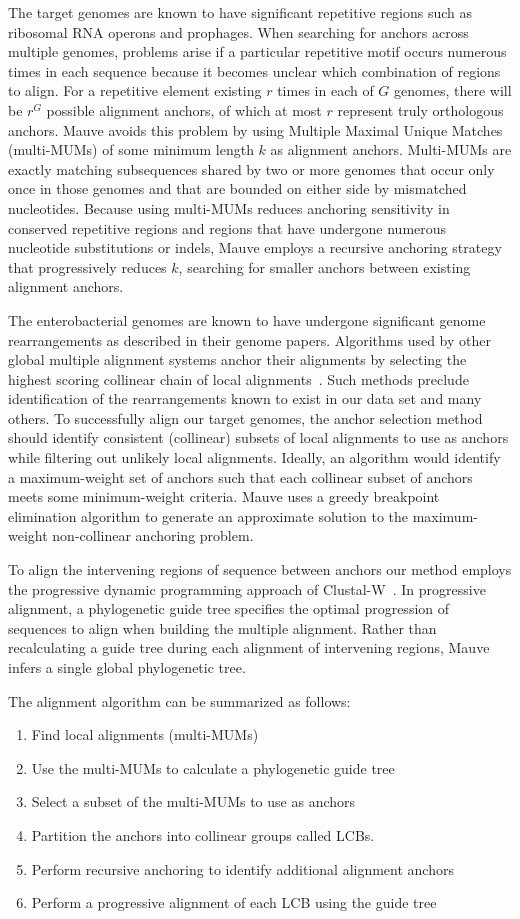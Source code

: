 \documentclass[titlepage,11pt]{article}
\begin{document}
The target genomes are known to have significant repetitive regions such as
ribosomal RNA operons and prophages.  When searching for anchors across
multiple genomes, problems arise if a particular repetitive motif occurs
numerous times in each sequence because it becomes unclear which combination of
regions to align.  For a repetitive element existing $r$ times in each of $G$
genomes, there will be $r^G$ possible alignment anchors, of which at most $r$
represent truly orthologous anchors.  Mauve avoids this
problem by using Multiple Maximal Unique Matches (multi-MUMs) of some minimum
length $k$ as alignment
anchors.  Multi-MUMs are exactly matching subsequences shared by two or more
genomes that occur only once in those genomes and that are bounded on either
side by mismatched nucleotides.  Because using multi-MUMs reduces
anchoring sensitivity in conserved repetitive regions and regions that have undergone
numerous nucleotide substitutions or indels, Mauve employs a recursive anchoring
strategy that progressively reduces $k$, searching for smaller anchors between
existing alignment anchors.

The enterobacterial genomes are known to have undergone significant genome
rearrangements as described in their genome papers.  Algorithms used by other
global multiple
alignment systems anchor their alignments by selecting the highest scoring
collinear chain of local alignments~\citep{mga,mavid}.  Such methods preclude 
identification of the rearrangements known to exist in our data
set and many others. To
successfully align our target genomes, the anchor selection method should
identify consistent (collinear) subsets of local alignments to use as anchors
while filtering out unlikely local alignments. Ideally, an algorithm would
identify a maximum-weight set of anchors such that each collinear subset of
anchors meets some minimum-weight criteria.  Mauve uses a greedy breakpoint
elimination algorithm to
generate an approximate solution to the maximum-weight non-collinear anchoring
problem.

To align the intervening regions of sequence between anchors our method employs
the progressive dynamic programming approach of Clustal-W~\citep{clustalw}.  In progressive
alignment, a phylogenetic guide tree specifies the optimal progression of
sequences to align when building the multiple alignment.  Rather than
recalculating a guide tree during each alignment of intervening regions, Mauve
infers a single global phylogenetic tree.  

The alignment algorithm can be summarized as follows:
\begin{enumerate}
\item Find local alignments (multi-MUMs)
\item Use the multi-MUMs to calculate a phylogenetic guide tree
\item Select a subset of the multi-MUMs to use as anchors
\item Partition the anchors into collinear groups called LCBs.
\item Perform recursive anchoring to identify additional alignment anchors
\item Perform a progressive alignment of each LCB using the guide tree
\end{enumerate}
\end{document}

